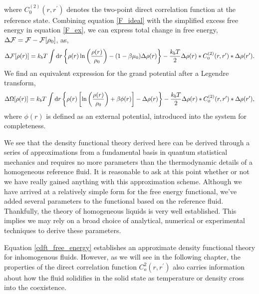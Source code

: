 %
where $C^{(2)}_0(r, r^\prime)$ denotes the two-point direct correlation
function at the reference state.  Combining equation \ref{F_ideal} with the
simplified excess free energy in equation \ref{F_ex}, we can express total
change in free energy, $\Delta \mathcal{F} = \mathcal{F} - \mathcal{F}[\rho_0]$, as,
%
\begin{equation}
    \label{cdft_free_energy}
    \Delta \mathcal{F} [\rho(r)] 
        = k_b T\int \mathrm{d}r 
            \left\lbrace \rho(r) \ln\left(\frac{\rho(r)}{\rho_0} \right) 
            - (1-\beta\mu_0) \Delta \rho(r)\right\rbrace 
        - \frac{k_b T}{2}\Delta \rho(r) \ast C_0^{(2)}(r, r^\prime) 
            \ast \Delta \rho(r^\prime).
\end{equation}
%
We find an equivalent expression for the grand potential after a Legendre
transform,
%
\begin{equation}
    \label{cdft_grand_potential}
    \Delta \Omega [\rho(r)]
        = k_b T\int \mathrm{d}r 
            \left\lbrace \rho(r) \left[\ln\left(\frac{\rho(r)}{\rho_0} \right) 
            + \beta\phi(r) \right] -  \Delta \rho(r)\right\rbrace 
        - \frac{k_b T}{2}\Delta \rho(r) \ast C_0^{(2)}(r, r^\prime) 
            \ast \Delta \rho(r^\prime),
\end{equation}
%
where $\phi(r)$ is defined as an external potential, introduced into the system
for completeness.

We see that the density functional theory derived here can be derived through a
series of approximations from a fundamental basis in quantum statistical
mechanics  and requires no more parameters than the thermodynamic details of a
homogeneous  reference fluid. It is reasonable to ask at this point whether or
not we have really gained anything with this approximation scheme.  Although we
have arrived at a relatively simple form for the free energy functional, we've
added several parameters to the functional based on the reference fluid.
Thankfully, the theory of homogeneous liquids is very well established.  This
implies we may rely on a broad choice of analytical, numerical or experimental
techniques to derive these parameters.

Equation \ref{cdft_free_energy} establishes an approximate density functional
theory for inhomogenous fluids. However, as we will see in the following
chapter, the properties of the direct correlation function  $C_o^2(r,r^\prime)$
also carries information  about how the fluid solidifies in the solid state as
temperature or density cross into the coexistence.
